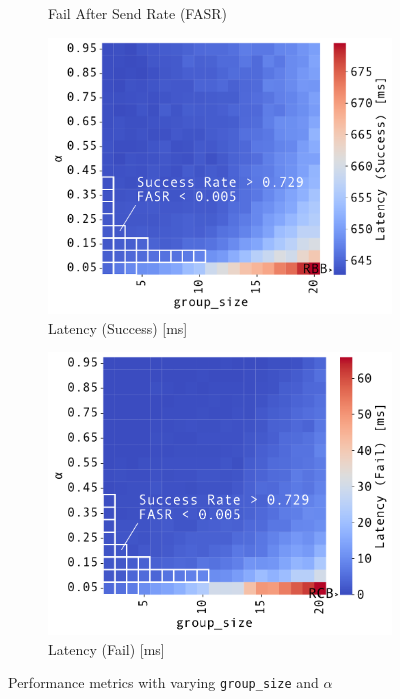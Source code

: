 \documentclass[conference]{IEEEtran}
\newcommand{\groupsize}{\texttt{group\_size}}
\begin{document}
\begin{figure}[htbp]
\begin{subfigure}{0.254\textwidth}
		\caption{Fail After Send Rate (FASR)}
	\end{subfigure}
	\hfill
	\begin{subfigure}{0.243\textwidth}
		\centering
		\includegraphics[width=\linewidth]{fig/group_limit_rate_and_group_size_heatmap_latency_success}
		\caption{Latency (Success) [ms]}
	\end{subfigure}
	\hfill
	\begin{subfigure}{0.2375\textwidth}
		\centering
		\includegraphics[width=\linewidth]{fig/group_limit_rate_and_group_size_heatmap_latency_fail}
		\caption{Latency (Fail) [ms]}
	\end{subfigure}
	\caption{Performance metrics with varying \groupsize{} and $\alpha$}
	\label{fig:group_params_vs_success_rate}
\end{figure}
\end{document}

